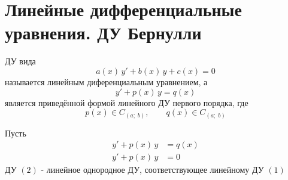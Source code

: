 \section{Линейные дифференциальные уравнения. ДУ Бернулли}

\begin{Def}[Линейное ДУ]
    ДУ вида 
    \[
        a(x)\,y' + b(x)\,y + c(x) = 0
    \] 
    называется линейным диференциальным уравнением, а\\
    \[
        y'+p(x)\,y=q(x)
    \]
    является приведённой формой линейного ДУ первого порядка, где
    \[
        p(x)\in C_{(a;\;b)}, \qquad q(x) \in C_{(a;\;b)}
    \]
\end{Def}

\begin{Def}
    Пусть 
    \begin{align}
        y'+p(x)\,y&=q(x)\\
        y'+p(x)\,y&=0
    \end{align}
    ДУ $(2)$ - линейное однородное ДУ, соответствующее линейному ДУ $(1)$\\
\end{Def}

